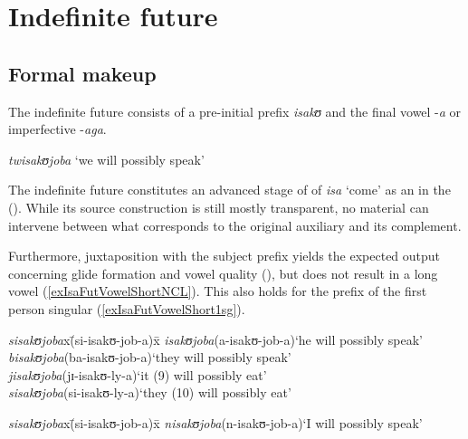 \section{Indefinite future}\label{isaFut}
\subsection{Formal makeup}
The indefinite future consists of a pre-initial prefix \textit{isakʊ} and the final vowel -\textit{a} or imperfective -\textit{aga}.

\begin{exe}
\ex \textit{twisakʊjoba} \lq we will possibly speak'
\end{exe}

The indefinite future constitutes an advanced stage of  of \textit{isa} \lq come' as an  in the  (). While its source construction is still mostly transparent, no material can intervene between what corresponds to the original auxiliary and its  complement. 

\begin{exe}
\ex \begin{xlist}
\end{xlist}
\end{exe}

Furthermore, juxtaposition with the subject prefix yields the expected output concerning glide formation and vowel quality (), but does not result in a long vowel (\ref{exIsaFutVowelShortNCL}). This also holds for the prefix of the first person singular (\ref{exIsaFutVowelShort1sg}).
\begin{exe}
\ex \label{exIsaFutVowelShortNCL}\begin{tabbing}
\textit{sisakʊjoba}x\=(\degree si-isakʊ-job-a)x\=\kill%
\textit{isakʊjoba}\>(\degree a-isakʊ-job-a)\>`he will possibly speak'\\ 
\textit{bisakʊjoba}\>(\degree ba-isakʊ-job-a)\>`they will possibly speak'\\
\textit{jisakʊjoba}\>(\degree jɪ-isakʊ-ly-a)\>`it (9) will possibly eat'\\ 
\textit{sisakʊjoba}\>(\degree si-isakʊ-ly-a)\>`they (10) will possibly eat'
\end{tabbing} 
\ex\label{exIsaFutVowelShort1sg}
\begin{tabbing}
\textit{sisakʊjoba}x\=(\degree si-isakʊ-job-a)x\=\kill%
\textit{nisakʊjoba}\>(\degree n-isakʊ-job-a)\>`I will possibly speak'
\end{tabbing}
\end{exe}

